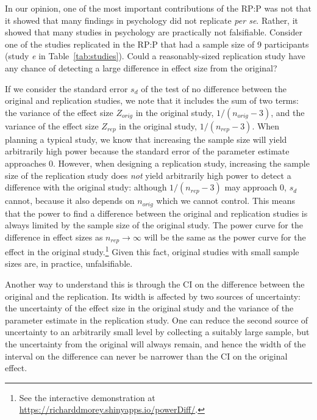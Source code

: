 \documentclass[doc,a4paper,floatsintext,draftfirst]{apa6}
\begin{document}
In our opinion, one of the most important contributions of the RP:P was not that it showed that many findings in psychology did not replicate {\em per se}. Rather, it showed that many studies in psychology are practically not falsifiable. Consider one of the studies replicated in the RP:P that had a sample size of 9 participants (study {\em e} in Table~\ref{tab:studies}). Could a reasonably-sized replication study have any chance of detecting a large difference in effect size from the original? 

If we consider the standard error $s_d$ of the test of no difference between the original and replication studies, we note that it includes the sum of two terms: the variance of the effect size $Z_{orig}$ in the original study, $1/(n_{orig}-3)$, and the variance of the effect size $Z_{rep}$ in the original study, $1/(n_{rep}-3)$. When planning a typical study, we know that increasing the sample size will yield arbitrarily high power because the standard error of the parameter estimate approaches 0. However, when designing a replication study, increasing the sample size of the replication study does {\em not} yield arbitrarily high power to detect a difference with the original study: although $1/(n_{rep}-3)$ may approach 0, $s_d$ cannot, because it also depends on $n_{orig}$ which we cannot control. This means that the power to find a difference between the original and replication studies is always limited by the sample size of the original study. The power curve for the difference in effect sizes as $n_{rep}\rightarrow\infty$ will be the same as the power curve for the effect in the original study.\footnote{See the interactive demonstration at \url{https://richarddmorey.shinyapps.io/powerDiff/}.} Given this fact, original studies with small sample sizes are, in practice, unfalsifiable. 

Another way to understand this is through the CI on the difference between the original and the replication. Its width is affected by two sources of uncertainty: the uncertainty of the effect size in the original study and the variance of the parameter estimate in the replication study. One can reduce the second source of uncertainty to an arbitrarily small level by collecting a suitably large sample, but the uncertainty from the original will always remain, and hence the width of the interval on the difference can never be narrower than the CI on the original effect.
\end{document}
